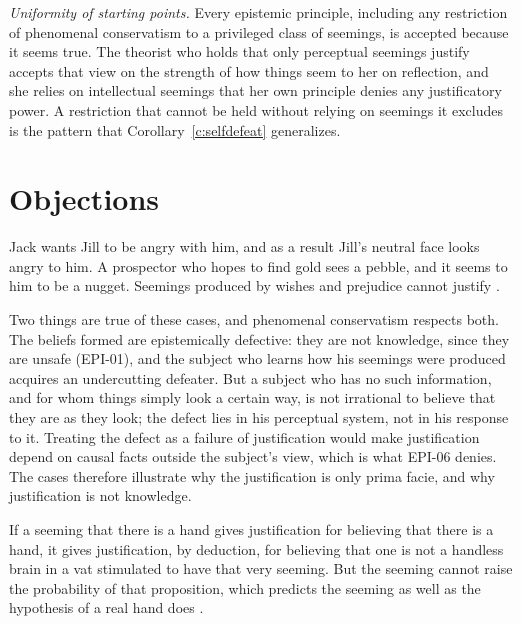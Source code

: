 \documentclass{situationist-preprint}
\begin{document}
\emph{Uniformity of starting points.} Every epistemic principle, including any restriction of phenomenal conservatism to a privileged class of seemings, is accepted because it seems true. The theorist who holds that only perceptual seemings justify accepts that view on the strength of how things seem to her on reflection, and she relies on intellectual seemings that her own principle denies any justificatory power. A restriction that cannot be held without relying on seemings it excludes is the pattern that Corollary~\ref{c:selfdefeat} generalizes.

\section{Objections}

\begin{objection}
Jack wants Jill to be angry with him, and as a result Jill's neutral face looks angry to him. A prospector who hopes to find gold sees a pebble, and it seems to him to be a nugget. Seemings produced by wishes and prejudice cannot justify \citep{Markie2005,Siegel2012}.
\end{objection}

\begin{reply}
Two things are true of these cases, and phenomenal conservatism respects both. The beliefs formed are epistemically defective: they are not knowledge, since they are unsafe (EPI-01), and the subject who learns how his seemings were produced acquires an undercutting defeater. But a subject who has no such information, and for whom things simply look a certain way, is not irrational to believe that they are as they look; the defect lies in his perceptual system, not in his response to it. Treating the defect as a failure of justification would make justification depend on causal facts outside the subject's view, which is what EPI-06 denies. The cases therefore illustrate why the justification is only prima facie, and why justification is not knowledge.
\end{reply}

\begin{objection}
If a seeming that there is a hand gives justification for believing that there is a hand, it gives justification, by deduction, for believing that one is not a handless brain in a vat stimulated to have that very seeming. But the seeming cannot raise the probability of that proposition, which predicts the seeming as well as the hypothesis of a real hand does \citep{White2006}.
\end{objection}
\end{document}
